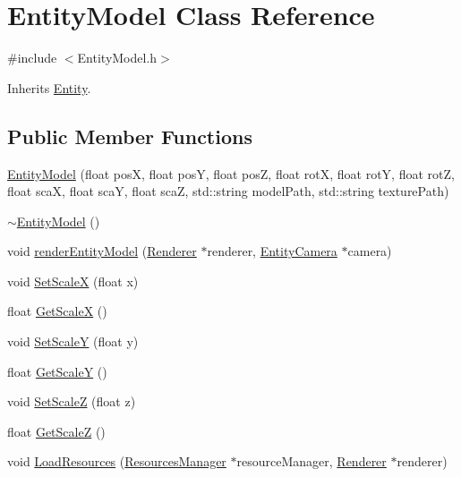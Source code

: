 \hypertarget{class_entity_model}{\section{Entity\-Model Class Reference}
\label{class_entity_model}
}


{\ttfamily \#include $<$Entity\-Model.\-h$>$}



Inherits \hyperlink{class_entity}{Entity}.

\subsection*{Public Member Functions}
\begin{DoxyCompactItemize}
\item 
\hyperlink{class_entity_model_a0b116646cca29067e9519402aeb5b188}{Entity\-Model} (float pos\-X, float pos\-Y, float pos\-Z, float rot\-X, float rot\-Y, float rot\-Z, float sca\-X, float sca\-Y, float sca\-Z, std\-::string model\-Path, std\-::string texture\-Path)
\item 
\hyperlink{class_entity_model_a3c0f7e027bcbd2af3617724a460a447c}{$\sim$\-Entity\-Model} ()
\item 
void \hyperlink{class_entity_model_a829fba156b805c1657ca6ce3caf9e8b5}{render\-Entity\-Model} (\hyperlink{class_renderer}{Renderer} $\ast$renderer, \hyperlink{class_entity_camera}{Entity\-Camera} $\ast$camera)
\item 
void \hyperlink{class_entity_model_a413b2bc4db6e472672982bbe28962bf2}{Set\-Scale\-X} (float x)
\item 
float \hyperlink{class_entity_model_aac39ccf2b12f8a63f27a6ffa2ffee9a2}{Get\-Scale\-X} ()
\item 
void \hyperlink{class_entity_model_aa3eb6e49cd41eabefc99280ccb414af9}{Set\-Scale\-Y} (float y)
\item 
float \hyperlink{class_entity_model_a982369e6e47959fd275c677546473fa2}{Get\-Scale\-Y} ()
\item 
void \hyperlink{class_entity_model_a0bb9038b6bfece059d5a43b7cc6781f0}{Set\-Scale\-Z} (float z)
\item 
float \hyperlink{class_entity_model_a1380ee58be0b3747f2c83cdd94cee31b}{Get\-Scale\-Z} ()
\item 
void \hyperlink{class_entity_model_afa0d89b61e5c3f5db488b9ef900bde04}{Load\-Resources} (\hyperlink{class_resources_manager}{Resources\-Manager} $\ast$resource\-Manager, \hyperlink{class_renderer}{Renderer} $\ast$renderer)
\end{DoxyCompactItemize}

